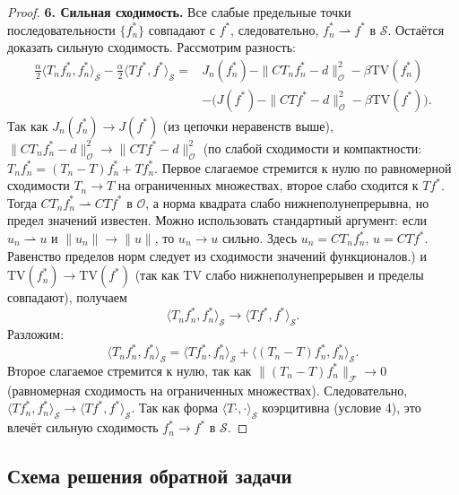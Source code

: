 \documentclass[sn-mathphys-num]{bst/sn-jnl}
\theoremstyle{thmstylethree}
\theoremstyle{thmstyletwo}
\theoremstyle{thmstyleone}
\begin{document}
\begin{proof}
\textbf{6. Сильная сходимость.}
Все слабые предельные точки последовательности $\{f_n^*\}$ совпадают с $f^*$, следовательно, $f_n^* \rightharpoonup f^*$ в $\mathcal{S}$.
Остаётся доказать сильную сходимость. Рассмотрим разность:
\begin{align*}
    \frac{\alpha}{2} \langle T_n f_n^*, f_n^*\rangle_{\mathcal{S}} - \frac{\alpha}{2} \langle T f^*, f^*\rangle_{\mathcal{S}}
    =& J_n(f_n^*) - \|C T_n f_n^* - d\|_{\mathcal{O}}^2 - \beta \mathrm{TV}(f_n^*) \\
    &- \bigl( J(f^*) - \|C T f^* - d\|_{\mathcal{O}}^2 - \beta \mathrm{TV}(f^*) \bigr).
\end{align*}
Так как $J_n(f_n^*) \to J(f^*)$ (из цепочки неравенств выше), $\|C T_n f_n^* - d\|_{\mathcal{O}}^2 \to \|C T f^* - d\|_{\mathcal{O}}^2$ (по слабой сходимости и компактности: $T_n f_n^* = (T_n - T) f_n^* + T f_n^*$. Первое слагаемое стремится к нулю по равномерной сходимости $T_n \to T$ на ограниченных множествах, второе слабо сходится к $T f^*$. Тогда $C T_n f_n^* \rightharpoonup C T f^*$ в $\mathcal{O}$, а норма квадрата слабо нижнеполунепрерывна, но предел значений известен. Можно использовать стандартный аргумент: если $u_n \rightharpoonup u$ и $\|u_n\| \to \|u\|$, то $u_n \to u$ сильно. Здесь $u_n = C T_n f_n^*$, $u = C T f^*$. Равенство пределов норм следует из сходимости значений функционалов.) и $\mathrm{TV}(f_n^*) \to \mathrm{TV}(f^*)$ (так как $\mathrm{TV}$ слабо нижнеполунепрерывен и пределы совпадают), получаем
\begin{equation}
    \langle T_n f_n^*, f_n^*\rangle_{\mathcal{S}} \to \langle T f^*, f^*\rangle_{\mathcal{S}}.
\end{equation}
Разложим:
\begin{equation}
    \langle T_n f_n^*, f_n^*\rangle_{\mathcal{S}} = \langle T f_n^*, f_n^*\rangle_{\mathcal{S}} + \langle (T_n - T) f_n^*, f_n^*\rangle_{\mathcal{S}}.
\end{equation}
Второе слагаемое стремится к нулю, так как $\| (T_n - T) f_n^*\|_{\mathcal{F}} \to 0$ (равномерная сходимость на ограниченных множествах).
Следовательно, $\langle T f_n^*, f_n^*\rangle_{\mathcal{S}} \to \langle T f^*, f^*\rangle_{\mathcal{S}}$.
Так как форма $\langle T \cdot, \cdot\rangle_{\mathcal{S}}$ коэрцитивна (условие 4), это влечёт сильную сходимость $f_n^* \to f^*$ в $\mathcal{S}$.
\end{proof}

\subsection{Схема решения обратной задачи}
\end{document}
